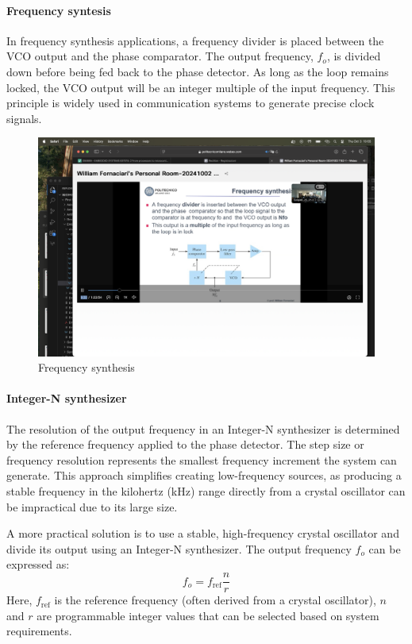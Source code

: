 \paragraph*{Frequency syntesis}
In frequency synthesis applications, a frequency divider is placed between the VCO output and the phase comparator. 
The output frequency, $f_{{o}}$, is divided down before being fed back to the phase detector. 
As long as the loop remains locked, the VCO output will be an integer multiple of the input frequency. 
This principle is widely used in communication systems to generate precise clock signals.
\begin{figure}[H]
    \centering
    \includegraphics[width=0.75\linewidth]{images/freq.png}
    \caption{Frequency synthesis}
\end{figure}

\paragraph*{Integer-N synthesizer}
The resolution of the output frequency in an Integer-N synthesizer is determined by the reference frequency applied to the phase detector. 
The step size or frequency resolution represents the smallest frequency increment the system can generate. 
This approach simplifies creating low-frequency sources, as producing a stable frequency in the kilohertz (kHz) range directly from a crystal oscillator can be impractical due to its large size.

A more practical solution is to use a stable, high-frequency crystal oscillator and divide its output using an Integer-N synthesizer.
The output frequency $f_{{o}}$ can be expressed as:
\[f_{{o}}=f_{\text{ref}}\dfrac{n}{r}\]
Here, $f_{\text{ref}}$ is the reference frequency (often derived from a crystal oscillator), $n$ and $r$ are programmable integer values that can be selected based on system requirements.

